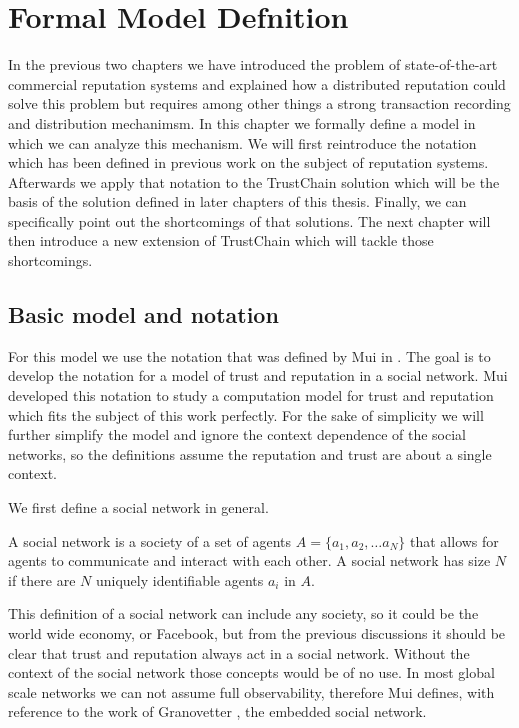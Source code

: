 \chapter{Formal Model Defnition}
In the previous two chapters we have introduced the problem of state-of-the-art commercial 
reputation systems and explained how a distributed reputation could solve this problem but requires
among other things a strong transaction recording and distribution mechanimsm. In this chapter we
formally define a model in which we can analyze this mechanism. We will first reintroduce the
notation which has been defined in previous work on the subject of reputation systems. Afterwards we
apply that notation to the TrustChain solution which will be the basis of the solution defined
in later chapters of this thesis. Finally, we can specifically point out the shortcomings of that
solutions. The next chapter will then introduce a new extension of TrustChain which will tackle
those shortcomings.


\section{Basic model and notation}
\label{sec:notation}
For this model we use the notation that was defined by Mui in \cite{mui2002computational}. The goal 
is to develop the notation for a model of trust and reputation in a social network. Mui developed 
this notation to study a computation model for trust and reputation which fits the subject of this 
work perfectly. For the sake of simplicity we will further simplify the model and ignore the context
dependence of the social networks, so the definitions assume the reputation and trust are about a
single context.

We first define a social network in general.

\begin{defn}
    A social network is a society of a set of agents $A = \{a_1, a_2, \dots a_N\}$ that allows for agents to communicate and
    interact with each other. A social network has size $N$ if there are $N$ uniquely identifiable
    agents $a_i$ in $A$.
\end{defn}

This definition of a social network can include any society, so it could be the world wide economy,
or Facebook, but from the previous discussions it should be clear that trust and reputation always 
act in a social network. Without the context of the social network those concepts would be of no
use. In most global scale networks we can not assume full observability, therefore Mui defines, with
reference to the work of Granovetter \cite{granovetter1985economic}, the embedded social network.

